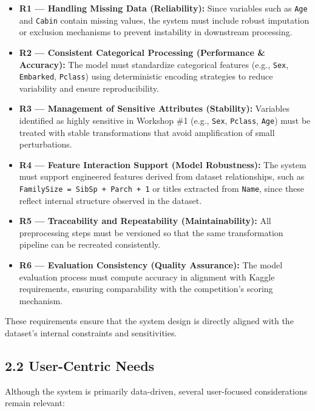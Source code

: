 \documentclass[12pt]{report}
\begin{document}
\begin{itemize}
    \item \textbf{R1 — Handling Missing Data (Reliability):}  
    Since variables such as \texttt{Age} and \texttt{Cabin} contain missing values, the system must include 
    robust imputation or exclusion mechanisms to prevent instability in downstream processing.

    \item \textbf{R2 — Consistent Categorical Processing (Performance \& Accuracy):}  
    The model must standardize categorical features (e.g., \texttt{Sex}, \texttt{Embarked}, \texttt{Pclass}) using 
    deterministic encoding strategies to reduce variability and ensure reproducibility.

    \item \textbf{R3 — Management of Sensitive Attributes (Stability):}  
    Variables identified as highly sensitive in Workshop \#1 (e.g., \texttt{Sex}, \texttt{Pclass}, \texttt{Age}) must be 
    treated with stable transformations that avoid amplification of small perturbations.

    \item \textbf{R4 — Feature Interaction Support (Model Robustness):}  
    The system must support engineered features derived from dataset relationships, such as 
    \texttt{FamilySize = SibSp + Parch + 1} or titles extracted from \texttt{Name}, since these reflect internal structure 
    observed in the dataset.

    \item \textbf{R5 — Traceability and Repeatability (Maintainability):}  
    All preprocessing steps must be versioned so that the same transformation pipeline can be recreated consistently.

    \item \textbf{R6 — Evaluation Consistency (Quality Assurance):}  
    The model evaluation process must compute accuracy in alignment with Kaggle requirements, ensuring comparability 
    with the competition's scoring mechanism.
\end{itemize}

These requirements ensure that the system design is directly aligned with the dataset’s internal constraints and sensitivities.

\subsection*{2.2 User-Centric Needs}

Although the system is primarily data-driven, several user-focused considerations remain relevant:
\end{document}
